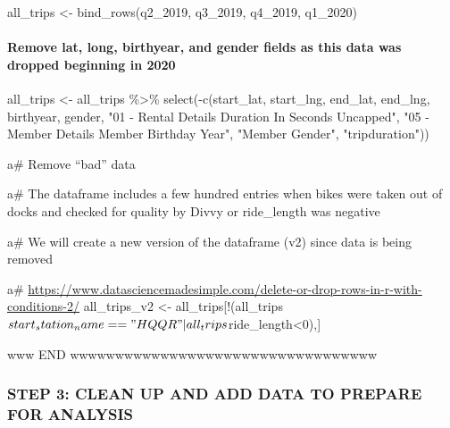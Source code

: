 \documentclass[
]{article}
\newenvironment{Shaded}{\begin{snugshade}}{\end{snugshade}}
\newcommand{\FunctionTok}[1]{\textcolor[rgb]{0.00,0.00,0.00}{#1}}
\newcommand{\NormalTok}[1]{#1}
\newcommand{\OtherTok}[1]{\textcolor[rgb]{0.56,0.35,0.01}{#1}}
\newcommand{\SpecialCharTok}[1]{\textcolor[rgb]{0.00,0.00,0.00}{#1}}
\newcommand{\StringTok}[1]{\textcolor[rgb]{0.31,0.60,0.02}{#1}}
\begin{document}
\begin{Shaded}
\begin{Highlighting}[]
\NormalTok{all\_trips }\OtherTok{\textless{}{-}} \FunctionTok{bind\_rows}\NormalTok{(q2\_2019, q3\_2019, q4\_2019, q1\_2020)}
\end{Highlighting}
\end{Shaded}

\hypertarget{remove-lat-long-birthyear-and-gender-fields-as-this-data-was-dropped-beginning-in-2020}{%
\paragraph{Remove lat, long, birthyear, and gender fields as this data
was dropped beginning in
2020}\label{remove-lat-long-birthyear-and-gender-fields-as-this-data-was-dropped-beginning-in-2020}}

\begin{Shaded}
\begin{Highlighting}[]
\NormalTok{all\_trips }\OtherTok{\textless{}{-}}\NormalTok{ all\_trips }\SpecialCharTok{\%\textgreater{}\%}  
  \FunctionTok{select}\NormalTok{(}\SpecialCharTok{{-}}\FunctionTok{c}\NormalTok{(start\_lat, start\_lng, end\_lat, end\_lng, }
\NormalTok{            birthyear, gender, }
            \StringTok{"01 {-} Rental Details Duration In Seconds Uncapped"}\NormalTok{, }
            \StringTok{"05 {-} Member Details Member Birthday Year"}\NormalTok{, }
            \StringTok{"Member Gender"}\NormalTok{, }\StringTok{"tripduration"}\NormalTok{))}
\end{Highlighting}
\end{Shaded}

a\# Remove ``bad'' data

a\# The dataframe includes a few hundred entries when bikes were taken
out of docks and checked for quality by Divvy or ride\_length was
negative

a\# We will create a new version of the dataframe (v2) since data is
being removed

a\#
\url{https://www.datasciencemadesimple.com/delete-or-drop-rows-in-r-with-conditions-2/}
all\_trips\_v2 \textless-
all\_trips{[}!(all\_trips\(start_station_name == "HQ QR" | all_trips\)ride\_length\textless0),{]}

www END wwwwwwwwwwwwwwwwwwwwwwwwwwwwwwwwww

\hypertarget{step-3-clean-up-and-add-data-to-prepare-for-analysis}{%
\subsubsection{STEP 3: CLEAN UP AND ADD DATA TO PREPARE FOR
ANALYSIS}\label{step-3-clean-up-and-add-data-to-prepare-for-analysis}}
\end{document}
